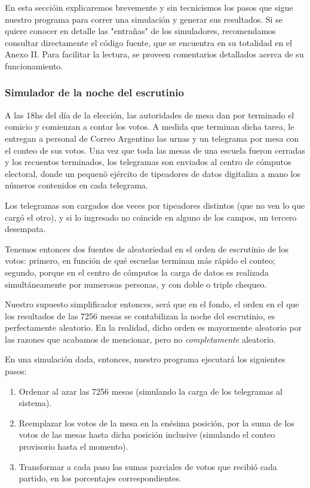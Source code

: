 \documentclass[12pt, a4paper]{article}
\begin{document}
En esta secci\'oin explicaremos brevemente y sin tecnicismos los pasos que sigue nuestro programa para correr una simulaci\'on y generar sus resultados. 
Si se quiere conocer en detalle las "entra\~nas" de los simuladores, recomendamos consultar directamente el c\'odigo fuente, que se encuentra en su totalidad en el Anexo II. Para facilitar la lectura, se proveen comentarios detallados acerca de su funcionamiento.

\subsubsection{Simulador de la noche del escrutinio}

A las 18hs del d\'ia de la elecci\'on, las autoridades de mesa dan por terminado el comicio y comienzan a contar los votos. A medida que terminan dicha tarea, le entregan a personal de Correo Argentino las urnas y un telegrama por mesa con el conteo de sus votos. Una vez que toda las mesas de una escuela fueron cerradas y los recuentos terminados, los telegramas son enviados al centro de c\'omputos electoral, donde un pequen\~o ej\'ercito de tipeadores de datos digitaliza a mano los n\'umeros contenidos en cada telegrama.

Los telegramas son cargados dos veces por tipeadores distintos (que no ven lo que carg\'o el otro), y si lo ingresado no coincide en alguno de los campos, un tercero desempata.

Tenemos entonces dos fuentes de aleatoriedad en el orden de escrutinio de los votos: primero, en funci\'on de qu\'e escuelas terminan m\'as r\'apido el conteo; segundo, porque en el centro de c\'omputos la carga de datos es realizada simult\'aneamente por numerosas personas, y con doble o triple chequeo.

Nuestro supuesto simplificador entonces, ser\'a que en el fondo, el orden en el que los resultados de las 7256 mesas se contabilizan la noche del escrutinio, es perfectamente aleatorio. En la realidad, dicho orden es mayormente aleatorio por las razones que acabamos de mencionar, pero no \emph{completamente} aleatorio.

En una simulaci\'on dada, entonces, nuestro programa ejecutar\'a los siguientes pasos:

\begin{enumerate}
	\item Ordenar al azar las 7256 mesas (simulando la carga de los telegramas al sistema).
	\item Reemplazar los votos de la mesa en la en\'esima posici\'on, por la suma de los votos de las mesas hasta dicha posici\'on inclusive (simulando el conteo provisorio hasta el momento).
	\item Transformar a cada paso las sumas parciales de votos que recibi\'o cada partido, en los porcentajes correspondientes.
\end{enumerate}
\end{document}
